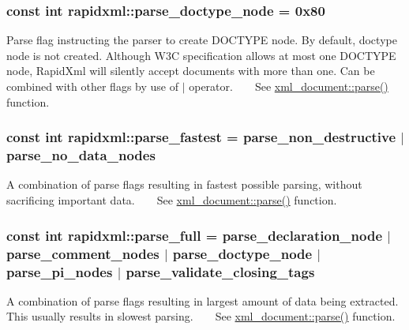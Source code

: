 \subsubsection[{parse\+\_\+doctype\+\_\+node}]{\setlength{\rightskip}{0pt plus 5cm}const int rapidxml\+::parse\+\_\+doctype\+\_\+node = 0x80}\label{namespacerapidxml_a41002b49780a90a0bbcc28ce8b895fe4}
Parse flag instructing the parser to create D\+O\+C\+T\+Y\+P\+E node. By default, doctype node is not created. Although W3\+C specification allows at most one D\+O\+C\+T\+Y\+P\+E node, Rapid\+Xml will silently accept documents with more than one. Can be combined with other flags by use of $\vert$ operator. ~\newline
~\newline
 See \hyperlink{classrapidxml_1_1xml__document_ac6e73ff9ac323bf5a370c38feb03a6b1}{xml\+\_\+document\+::parse()} function. \hypertarget{namespacerapidxml_a64da06dfdab7c86ca954bda4fecb978f}{}
\subsubsection[{parse\+\_\+fastest}]{\setlength{\rightskip}{0pt plus 5cm}const int rapidxml\+::parse\+\_\+fastest = {\bf parse\+\_\+non\+\_\+destructive} $\vert$ {\bf parse\+\_\+no\+\_\+data\+\_\+nodes}}\label{namespacerapidxml_a64da06dfdab7c86ca954bda4fecb978f}
A combination of parse flags resulting in fastest possible parsing, without sacrificing important data. ~\newline
~\newline
 See \hyperlink{classrapidxml_1_1xml__document_ac6e73ff9ac323bf5a370c38feb03a6b1}{xml\+\_\+document\+::parse()} function. \hypertarget{namespacerapidxml_abb48dc65db75d9e49734bc5bd2fabbfc}{}
\subsubsection[{parse\+\_\+full}]{\setlength{\rightskip}{0pt plus 5cm}const int rapidxml\+::parse\+\_\+full = {\bf parse\+\_\+declaration\+\_\+node} $\vert$ {\bf parse\+\_\+comment\+\_\+nodes} $\vert$ {\bf parse\+\_\+doctype\+\_\+node} $\vert$ {\bf parse\+\_\+pi\+\_\+nodes} $\vert$ {\bf parse\+\_\+validate\+\_\+closing\+\_\+tags}}\label{namespacerapidxml_abb48dc65db75d9e49734bc5bd2fabbfc}
A combination of parse flags resulting in largest amount of data being extracted. This usually results in slowest parsing. ~\newline
~\newline
 See \hyperlink{classrapidxml_1_1xml__document_ac6e73ff9ac323bf5a370c38feb03a6b1}{xml\+\_\+document\+::parse()} function. \hypertarget{namespacerapidxml_ac2d21ef14a4e8936b94aca5d38b1a74d}{}
